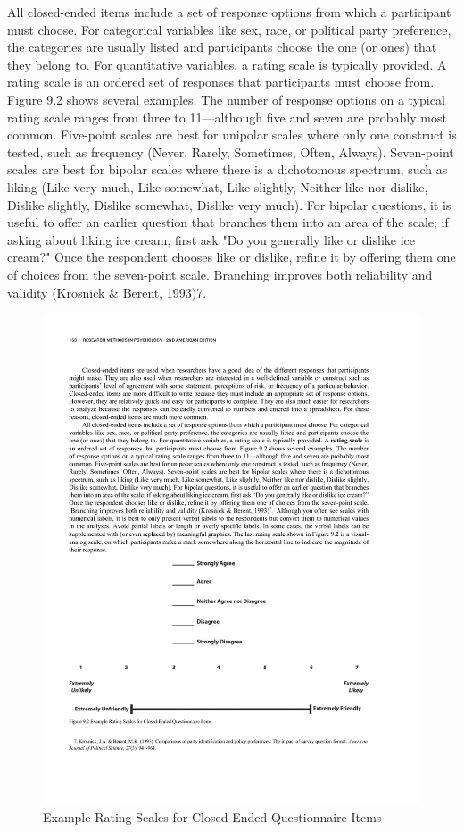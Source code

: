 All closed-ended items include a set of response options from which a participant must choose. For categorical variables like sex, race, or political party preference, the categories are usually listed and participants choose the one (or ones) that they belong to. For quantitative variables, a rating scale is typically provided. A rating scale is an ordered set of responses that participants must choose from. Figure 9.2 shows several examples. The number of response options on a typical rating scale ranges from three to 11---although five and seven are probably most common. Five-point scales are best for unipolar scales where only one construct is tested, such as frequency (Never, Rarely, Sometimes, Often, Always). Seven-point scales are best for bipolar scales where there is a dichotomous spectrum, such as liking (Like very much, Like somewhat, Like slightly, Neither like nor dislike, Dislike slightly, Dislike somewhat, Dislike very much). For bipolar questions, it is useful to offer an earlier question that branches them into an area of the scale; if asking about liking ice cream, first ask "Do you generally like or dislike ice cream?" Once the respondent chooses like or dislike, refine it by offering them one of choices from the seven-point scale.
Branching improves both reliability and validity (Krosnick \& Berent, 1993)7. 


\begin{figure}


\includegraphics[width=.7\linewidth]{figures/C9scales.pdf}


\caption{Example Rating Scales for Closed-Ended Questionnaire Items}


\label{fig:scales}


\end{figure}


